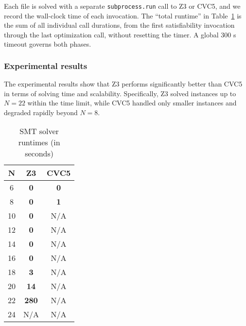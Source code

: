 Each file is solved with a separate \texttt{subprocess.run} call to Z3 or CVC5, and we record the wall-clock time of each invocation. The “total runtime” in Table~\ref{table:smt-result} is the sum of all individual call durations, from the first satisfiability invocation through the last optimization call, without resetting the timer. A global 300 s timeout governs both phases.


\subsubsection{Experimental results}

The experimental results show that Z3 performs significantly better than CVC5 in terms of solving time and scalability. Specifically, Z3 solved instances up to $N=22$ within the time limit, while CVC5 handled only smaller instances and degraded rapidly beyond $N=8$.

\begin{table}[H]
\centering
\small
\begin{tabular}{|c|c|c|}
\toprule
\textbf{N} & \textbf{Z3} & \textbf{CVC5} \\
\midrule
6  & \textbf{0}   & \textbf{0}   \\
8  & \textbf{0}   & \textbf{1}   \\
10 & \textbf{0}   & N/A \\
12 & \textbf{0}   & N/A \\
14 & \textbf{0}   & N/A \\
16 & \textbf{0}   & N/A \\
18 & \textbf{3}   & N/A \\
20 & \textbf{14}  & N/A \\
22 & \textbf{280} & N/A \\
24 & N/A & N/A \\
\bottomrule
\end{tabular}
\caption{SMT solver runtimes (in seconds)}
\label{table:smt-result}
\end{table}

